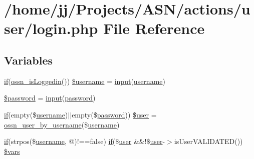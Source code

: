 \hypertarget{actions_2user_2login_8php}{}\section{/home/jj/\+Projects/\+A\+S\+N/actions/user/login.php File Reference}
\label{actions_2user_2login_8php}
\subsection*{Variables}
\begin{DoxyCompactItemize}
\item 
\hyperlink{jquery_8tokeninput_8js_ad8dd46a3cbc004569e34401e9e71771a}{if}(\hyperlink{ossn_8lib_8users_8php_a709b82b89b564332723652ed2a36e6b8}{ossn\+\_\+is\+Loggedin}()) \hyperlink{actions_2user_2login_8php_ae55aec6661bcbd0a1edbc7c356ad1fd4}{\$username} = \hyperlink{ossn_8lib_8input_8php_a64ebee98b041c4f75f71ed3cd73cc8ed}{input}(\textquotesingle{}\hyperlink{actions_2account_8php_ac9b3768ccc688c2ff0811c50c107a02e}{username}\textquotesingle{})
\item 
\hyperlink{actions_2user_2login_8php_a607686ef9f99ea7c42f4f3dd3dbb2b0d}{\$password} = \hyperlink{ossn_8lib_8input_8php_a64ebee98b041c4f75f71ed3cd73cc8ed}{input}(\textquotesingle{}\hyperlink{actions_2account_8php_a3ef39d3ee8b2bcca6a288308549ccb44}{password}\textquotesingle{})
\item 
\hyperlink{jquery_8tokeninput_8js_ad8dd46a3cbc004569e34401e9e71771a}{if}(empty(\$\hyperlink{actions_2account_8php_ac9b3768ccc688c2ff0811c50c107a02e}{username})$\vert$$\vert$empty(\$\hyperlink{actions_2account_8php_a3ef39d3ee8b2bcca6a288308549ccb44}{password})) \hyperlink{actions_2user_2login_8php_a7cd1f50ebd490e28acaf45f2d0100209}{\$user} = \hyperlink{ossn_8lib_8users_8php_a77fdcb678aedd165af1f9f875645c864}{ossn\+\_\+user\+\_\+by\+\_\+username}(\$\hyperlink{actions_2account_8php_ac9b3768ccc688c2ff0811c50c107a02e}{username})
\item 
\hyperlink{jquery_8tokeninput_8js_ad8dd46a3cbc004569e34401e9e71771a}{if}(strpos(\$\hyperlink{actions_2account_8php_ac9b3768ccc688c2ff0811c50c107a02e}{username}, \textquotesingle{}@\textquotesingle{})!==false) \hyperlink{jquery_8tokeninput_8js_ad8dd46a3cbc004569e34401e9e71771a}{if}(\$\hyperlink{ossn_8config_8db_8example_8php_a802544b7ba9f79bbf24ef67773d53bed}{user} \&\&!\$\hyperlink{ossn_8config_8db_8example_8php_a802544b7ba9f79bbf24ef67773d53bed}{user}-\/$>$is\+User\+V\+A\+L\+I\+D\+A\+T\+ED()) \hyperlink{actions_2user_2login_8php_a09d52a8b7d99079a3273ba277fa2d7cb}{\$vars}
$$
\end{DoxyCompactItemize}
